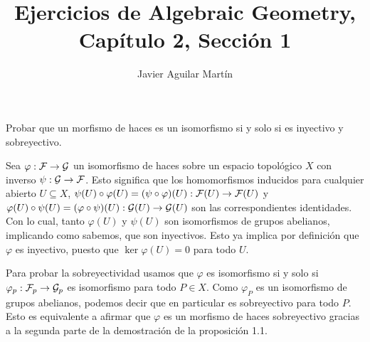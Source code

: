 \documentclass[twoside]{article}
\begin{document}
\title{Ejercicios de Algebraic Geometry, Capítulo 2, Sección 1}
\author{Javier Aguilar Martín}
\maketitle


%
%
%
%
%
%
%
%
%
%
%

\begin{ejercicio}{1.5}
Probar que un morfismo de haces es un isomorfismo si y solo si es inyectivo y sobreyectivo.

\end{ejercicio}
\begin{solucion}
Sea $\varphi:\mathcal{F}\to\mathcal{G}$ un isomorfismo de haces sobre un espacio topológico $X$ con inverso $\psi:\mathcal{G}\to\mathcal{F}$. Esto significa que los homomorfismos inducidos para cualquier abierto $U\subseteq X$, $\psi(U)\circ\varphi(U)=(\psi\circ\varphi)(U):\mathcal{F}(U)\to\mathcal{F}(U)$ y $\varphi(U)\circ\psi(U)=(\varphi\circ\psi)(U):\mathcal{G}(U)\to\mathcal{G}(U)$ son las correspondientes identidades. Con lo cual, tanto $\varphi(U)$ y $\psi(U)$ son isomorfismos de grupos abelianos, implicando como sabemos, que son inyectivos. Esto ya implica por definición que $\varphi$ es inyectivo, puesto que $\ker\varphi(U)=0$ para todo $U$. 

Para probar la sobreyectividad usamos que $\varphi$ es isomorfismo si y solo si $\varphi_p:\mathcal{F}_p\to\mathcal{G}_p$ es isomorfismo para todo $P\in X$. Como $\varphi_P$ es un isomorfismo de grupos abelianos, podemos decir que en particular es sobreyectivo para todo $P$. Esto es equivalente a afirmar que $\varphi$ es un morfismo de haces sobreyectivo gracias a la segunda parte de la demostración de la proposición 1.1. 
\end{solucion}
\end{document}
